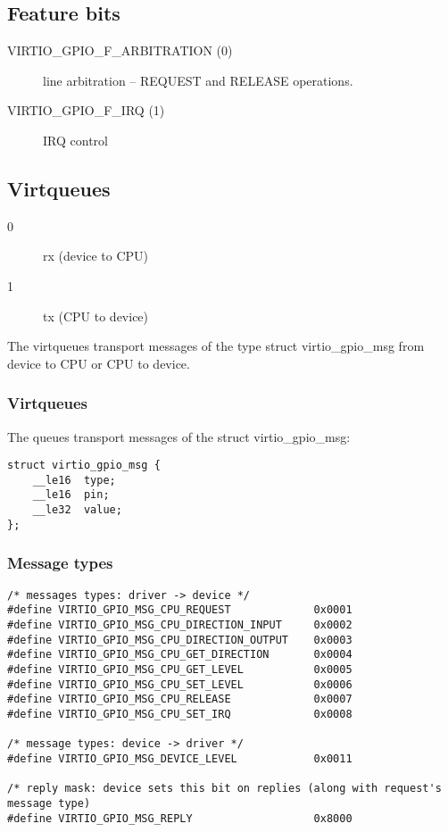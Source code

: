 \subsection{Feature bits}\label{sec:Device Types / General Purpose IO / Feature bits}

\begin{description}
\item[VIRTIO_GPIO_F_ARBITRATION (0)] line arbitration -- REQUEST and RELEASE operations.
\item[VIRTIO_GPIO_F_IRQ (1)] IRQ control
\end{description}

\subsection{Virtqueues}\label{sec:Device Types / General Purpose IO / Virtqueues}
\begin{description}
\item[0] rx (device to CPU)
\item[1] tx (CPU to device)
\end{description}

The virtqueues transport messages of the type struct virtio_gpio_msg from device to CPU or CPU to device.

\subsubsection{Virtqueues}\label{sec:Device Types / General Purpose IO / Virtqueues / Message format}

The queues transport messages of the struct virtio_gpio_msg:

\begin{lstlisting}
struct virtio_gpio_msg {
    __le16  type;
    __le16  pin;
    __le32  value;
};
\end{lstlisting}

\subsubsection{Message types}\label{sec:Device Types / General Purpose IO / Virtqueues / Message types}

\begin{lstlisting}
/* messages types: driver -> device */
#define VIRTIO_GPIO_MSG_CPU_REQUEST             0x0001
#define VIRTIO_GPIO_MSG_CPU_DIRECTION_INPUT     0x0002
#define VIRTIO_GPIO_MSG_CPU_DIRECTION_OUTPUT    0x0003
#define VIRTIO_GPIO_MSG_CPU_GET_DIRECTION       0x0004
#define VIRTIO_GPIO_MSG_CPU_GET_LEVEL           0x0005
#define VIRTIO_GPIO_MSG_CPU_SET_LEVEL           0x0006
#define VIRTIO_GPIO_MSG_CPU_RELEASE             0x0007
#define VIRTIO_GPIO_MSG_CPU_SET_IRQ             0x0008

/* message types: device -> driver */
#define VIRTIO_GPIO_MSG_DEVICE_LEVEL            0x0011

/* reply mask: device sets this bit on replies (along with request's message type)
#define VIRTIO_GPIO_MSG_REPLY                   0x8000
\end{lstlisting}

